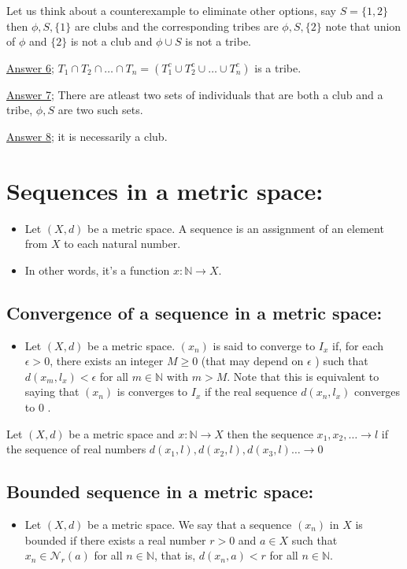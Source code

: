 \documentclass[12pt,a4paper]{article}
\begin{document}
Let us think about a counterexample to eliminate other options, say \(S=\{1,2\}\) then \(\phi, S, \{1\}\) are clubs and the corresponding tribes are \(\phi, S, \{2\}\) note that union of \(\phi\) and \(\{2\}\) is not a club and \(\phi \cup S\) is not a tribe.

\underline{Answer 6;}
\(T_{1}\cap T_{2}\cap \ldots \cap T_{n}= \left( T_{1}^c \cup T_{2}^c \cup \ldots \cup T_{n}^c \right)\) is a tribe.

\underline{Answer 7;}
There are atleast two sets of individuals that are both a club and a tribe, \(\phi, S\) are two such sets.

\underline{Answer 8;} it is necessarily a club.

 \section{Sequences in a metric space:} 
\begin{itemize}
    \item Let \((X, d)\) be a metric space. A sequence is an assignment of an element from \(X\) to each natural number.
    \item In other words, it's a function \(x: \mathbb{N} \rightarrow X\).
\end{itemize}
  \subsection{
    Convergence of a sequence in a metric space:} 
\begin{itemize}
    \item     Let \((X, d)\) be a metric space. \(\left(x_n\right)\) is said to converge to \(I_x\) if, for each \(\epsilon>0\), there exists an integer \(M \geq 0\) (that may depend on \(\epsilon\) ) such that \(d\left(x_m, l_x\right)<\epsilon\) for all \(m \in \mathbb{N}\) with \(m>M\). Note that this is equivalent to saying that \(\left(x_n\right)\) is converges to \(I_x\) if the real sequence \(d\left(x_n, l_x\right)\) converges to 0 .
\end{itemize}

Let \(\left( X,d \right) \) be a metric space and \(x: \mathbb{N} \rightarrow X\) then the sequence \(x_{1},x_{2},\ldots \to l\) if the sequence of real numbers \(d(x_{1},l),d(x_{2},l),d(x_{3},l)\ldots \to 0\) 

 \subsection{Bounded sequence in a metric space:} 
\begin{itemize}
    \item Let \((X, d)\) be a metric space. We say that a sequence \(\left(x_n\right)\) in \(X\) is bounded if there exists a real number \(r>0\) and \(a \in X\) such that \(x_n \in \mathcal{N}_r(a)\) for all \(n \in \mathbb{N}\), that is, \(d\left(x_n, a\right)<r\) for all \(n \in \mathbb{N}\).
\end{itemize}
\end{document}
